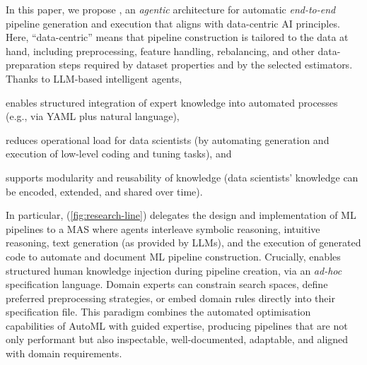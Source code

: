 \documentclass[runningheads]{llncs}
\begin{document}


In this paper,
we propose \ourapproach{}, 
an \emph{agentic} architecture for automatic \emph{end-to-end} pipeline generation and execution that aligns with data-centric \ac{AI} principles.
%
Here, 
``data-centric'' means that pipeline construction is tailored to the data at hand, 
including preprocessing, feature handling, rebalancing, and other data-preparation steps 
required by dataset properties and by the selected estimators.
%
Thanks to \ac{LLM}-based intelligent agents, \ourapproach{}
\begin{inlinelist}
    \item enables structured integration of expert knowledge into automated processes
    (e.g., via YAML plus natural language),
    \item reduces operational load for data scientists
    (by automating generation and execution of low-level coding and tuning tasks),
    and
    \item supports modularity and reusability of knowledge
    (data scientists' knowledge can be encoded, extended, and shared over time).
\end{inlinelist}

In particular, 
\ourapproach{} (\cref{fig:research-line}) delegates the design and implementation of \ac{ML} pipelines to a \ac{MAS}
where agents interleave symbolic reasoning, intuitive reasoning, text generation
(as provided by \acp{LLM}),
and the execution of generated code
to automate and document \ac{ML} pipeline construction.
%
Crucially,
\ourapproach{} enables structured human knowledge injection during pipeline creation,
via an \emph{ad-hoc} specification language.
%
Domain experts can constrain search spaces,
define preferred preprocessing strategies,
or
embed domain rules directly into their specification file.
%
This paradigm combines the automated optimisation capabilities of \ac{AutoML} with guided expertise,
producing pipelines that are not only performant but also inspectable, well-documented, adaptable,
and aligned with domain requirements.
\end{document}
